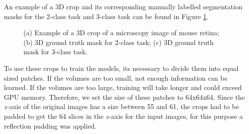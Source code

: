An example of a \ac{3D} crop and its corresponding manually labelled segmentation masks for the 2-class task and 3-class task can be found in Figure \ref{fig:dataset_original}.

\begin{figure}[!htb]
	\centering
	\hfil
  \hfil 
	\caption[(a) Example of a 3D crop of a microscopy image of mouse retina; (b) 3D ground truth mask for 2-class task; (c) 3D ground truth mask for 3-class task.]{(a) Example of a \ac{3D} crop of a microscopy image of mouse retina; (b) \ac{3D} ground truth mask for 2-class task; (c) \ac{3D} ground truth mask for 3-class task.}
	\label{fig:dataset_original}
\end{figure}

To use these crops to train the models, its necessary to divide them into equal sized patches. If the volumes are too small, not enough information can be learned. If the volumes are too large, training will take longer and could exceed GPU memory. Therefore, we set the size of these patches to 64x64x64. Since the $z$-axis of the original images has a size between 55 and 61, the crops had to be padded to get the 64 slices in the $z$-axis for the input images, for this purpose a reflection padding was applied.

